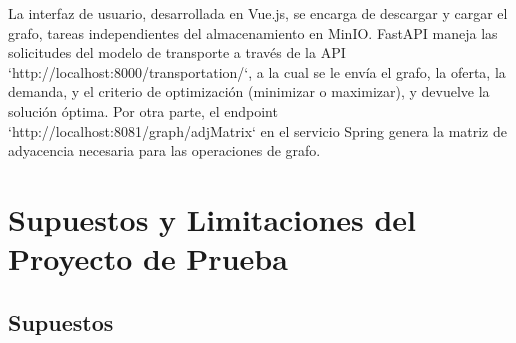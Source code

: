 \documentclass[stu, 12pt, letterpaper, donotrepeattitle, floatsintext, natbib]{apa7}
\begin{document}
La interfaz de usuario, desarrollada en Vue.js, se encarga de descargar y cargar el grafo, tareas independientes del almacenamiento en MinIO. FastAPI maneja las solicitudes del modelo de transporte a través de la API `http://localhost:8000/transportation/`, a la cual se le envía el grafo, la oferta, la demanda, y el criterio de optimización (minimizar o maximizar), y devuelve la solución óptima. Por otra parte, el endpoint `http://localhost:8081/graph/adjMatrix` en el servicio Spring genera la matriz de adyacencia necesaria para las operaciones de grafo.

\section{\large Supuestos y Limitaciones del Proyecto de Prueba}

\subsection{Supuestos}
\end{document}
